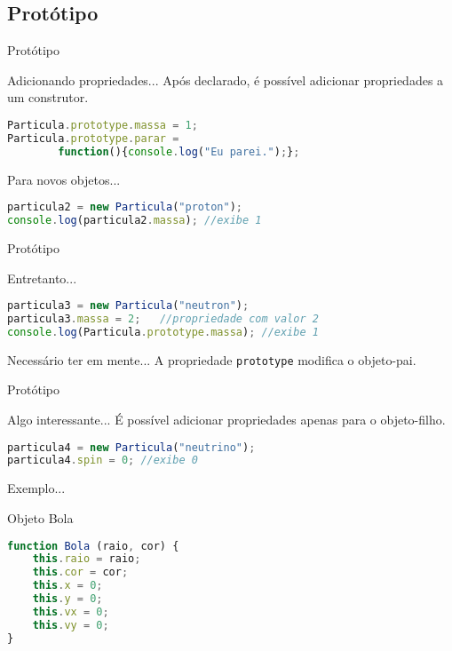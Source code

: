 \documentclass[xcolor=dvipsnames,table]{beamer}
\begin{document}
\subsection{Protótipo}
\begin{frame}[fragile]{Protótipo}
	\begin{block}{Adicionando propriedades...}
		Após declarado, é possível adicionar propriedades a um construtor.
		\begin{lstlisting}[language=JavaScript]
Particula.prototype.massa = 1;
Particula.prototype.parar = 
		function(){console.log("Eu parei.");};
\end{lstlisting}	
	\end{block} \pause
	\begin{block}{Para novos objetos...}
		\begin{lstlisting}[language=JavaScript]
particula2 = new Particula("proton");
console.log(particula2.massa); //exibe 1
\end{lstlisting}	
	\end{block}
\end{frame}

\begin{frame}[fragile]{Protótipo}
	\begin{block}{Entretanto...}
		\begin{lstlisting}[language=JavaScript]
particula3 = new Particula("neutron");
particula3.massa = 2;	//propriedade com valor 2
console.log(Particula.prototype.massa);	//exibe 1
\end{lstlisting}	
	\end{block} 
	\begin{alertblock}{Necessário ter em mente...}
		A propriedade {\tt prototype} modifica o objeto-pai.	
	\end{alertblock}
\end{frame}

\begin{frame}[fragile]{Protótipo}
	\begin{block}{Algo interessante...}
		É possível adicionar propriedades apenas para o objeto-filho.
		\begin{lstlisting}[language=JavaScript]
particula4 = new Particula("neutrino");
particula4.spin = 0; //exibe 0
\end{lstlisting}	
	\end{block}
\end{frame}

\begin{frame}[fragile]{Exemplo...}
	\begin{block}{Objeto Bola}
		\begin{lstlisting}[language=JavaScript]
function Bola (raio, cor) {
	this.raio = raio;
	this.cor = cor;
	this.x = 0;
	this.y = 0;
	this.vx = 0;
	this.vy = 0;
}
\end{lstlisting}	
	\end{block}
\end{frame}
\end{document}
